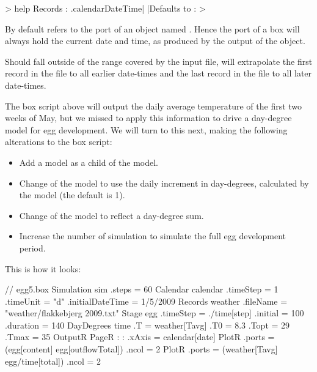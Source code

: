 \begin{usdialog}
> help Records
:
.calendarDateTime| |Defaults to %
:
>
\end{usdialog}

By default  refers to the  port of an object named . Hence the  port of a  box will always hold the current date and time, as produced by the  output of the  object.

Should  fall outside of the range covered by the input file,  will extrapolate the first record in the file to all earlier date-times and the last record in the file to all later date-times.

The box script above will output the daily average temperature of the first two weeks of May, but we missed to apply this information to drive a day-degree model for egg development. We will turn to this next, making the following alterations to the box script:
\begin{itemize}
\item Add a  model as a child of the  model.
\item Change  of the  model to use the daily increment in day-degrees, calculated by the  model (the default  is 1).
\item Change  of the  model to reflect a day-degree sum.
\item Increase the number of simulation  to simulate the full egg development period.
\end{itemize}
This is how it looks:

\lstset{numbers=left}
\begin{boxscript}[label=egg05-box]
// egg5.box
Simulation sim {
  .steps = 60
  Calendar calendar {
    .timeStep = 1
    .timeUnit = "d"
    .initialDateTime = 1/5/2009
  }
  Records weather {
    .fileName = "weather/flakkebjerg 2009.txt"
  }
  Stage egg {
    .timeStep = ./time[step]
    .initial = 100 
    .duration = 140
    DayDegrees time {
      .T = weather[Tavg]
      .T0 = 8.3
      .Topt = 29
      .Tmax = 35
    }
  }
  OutputR {
    PageR {
:
:
      .xAxis = calendar[date]
      PlotR {
        .ports = (egg[content] egg[outflowTotal])   
        .ncol = 2
      }
      PlotR {
        .ports = (weather[Tavg] egg/time[total])   
        .ncol = 2
      }
    }
  }
}\end{boxscript}
\lstset{numbers=none}

